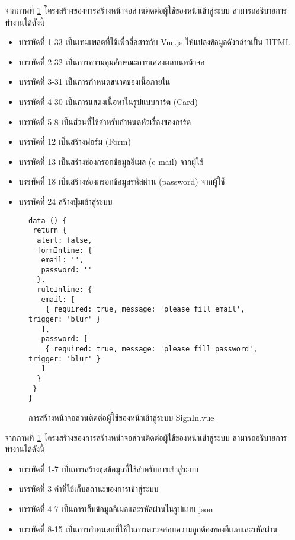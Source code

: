 	จากภาพที่ \ref{Fig:SignIn} โครงสร้างของการสร้างหน้าจอส่วนติดต่อผู้ใช้ของหน้าเข้าสู่ระบบ สามารถอธิบายการทำงานได้ดังนี้
	\begin{itemize}[label={--}]
		\item บรรทัดที่ 1-33  เป็นเทมเพลตที่ใช้เพื่อสี่อสารกับ Vue.js ให้แปลงข้อมูลดังกล่าวเป็น HTML
		\item บรรทัดที่ 2-32 เป็นการความคุมลักษณะการแสดงผลบนหน้าจอ
		\item บรรทัดที่ 3-31 เป็นการกำหนดขนาดของเนื้อภายใน
		\item บรรทัดที่ 4-30 เป็นการแสดงเนื้อหาในรูปแบบการ์ด (Card)
		\item บรรทัดที่ 5-8 เป็นส่วนที่ใช้สำหรับกำหนดหัวเรื่องของการ์ด
		\item บรรทัดที่ 12 เป็นสร้างฟอร์ม (Form)
		\item บรรทัดที่ 13 เป็นสร้างช่องกรอกข้อมูลอีเมล (e-mail) จากผู้ใช้
		\item บรรทัดที่ 18 เป็นสร้างช่องกรอกข้อมูลรหัสผ่าน (password) จากผู้ใช้
		\item บรรทัดที่ 24 สร้างปุ่มเข้าสู่ระบบ
	\end{itemize}

	\begin{figure}[H]
		{\begin{lstlisting}
data () {
 return {
  alert: false,
  formInline: {
   email: '',
   password: ''
  },
  ruleInline: {
   email: [
    { required: true, message: 'please fill email', trigger: 'blur' }
   ],
   password: [
    { required: true, message: 'please fill password', trigger: 'blur' }
   ]
  }
 }
}
			\end{lstlisting}}
		\caption{การสร้างหน้าจอส่วนติดต่อผู้ใช้ของหน้าเข้าสู่ระบบ SignIn.vue}
		\label{Fig:SignIn}
	\end{figure}
	จากภาพที่ \ref{Fig:SignIn} โครงสร้างของการสร้างหน้าจอส่วนติดต่อผู้ใช้ของหน้าเข้าสู่ระบบ สามารถอธิบายการทำงานได้ดังนี้
	\begin{itemize}[label={--}]
		\item บรรทัดที่ 1-7  เป็นการสร้างชุดข้อมูลที่ใช้สำหรับการเข้าสู่ระบบ
		\item บรรทัดที่ 3 ค่าที่ใช้เก็บสถานะของการเข้าสู่ระบบ
		\item บรรทัดที่ 4-7 เป็นการเก็บข้อมูลอีเมลและรหัสผ่านในรูปแบบ json
		\item บรรทัดที่ 8-15 เป็นการกำหนดกที่ใช้ในการตรวจสอบความถูกต้องของอีเมลและรหัสผ่าน
	\end{itemize}
	
